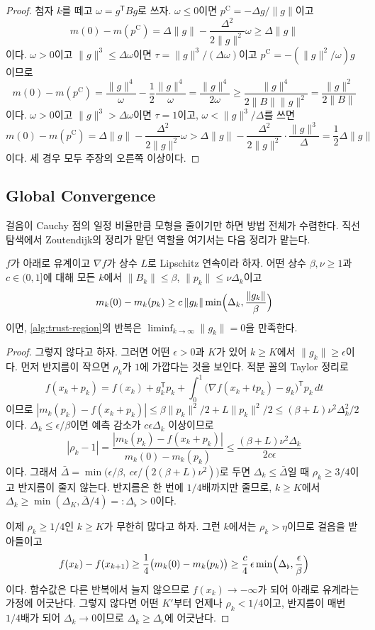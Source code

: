 \begin{proof}
첨자 $k$를 떼고 $\omega=g^{\mathsf T}Bg$로 쓰자. $\omega\le0$이면 $p^{\mathrm C}=-\Delta g/\|g\|$이고
\[
m(0)-m(p^{\mathrm C})=\Delta\|g\|-\frac{\Delta^2}{2\|g\|^2}\omega\ge\Delta\|g\|
\]
이다. $\omega>0$이고 $\|g\|^3\le\Delta\omega$이면 $\tau=\|g\|^3/(\Delta\omega)$이고 $p^{\mathrm C}=-(\|g\|^2/\omega)g$이므로
\[
m(0)-m(p^{\mathrm C})=\frac{\|g\|^4}{\omega}-\frac12\frac{\|g\|^4}{\omega}=\frac{\|g\|^4}{2\omega}\ge\frac{\|g\|^4}{2\|B\|\|g\|^2}=\frac{\|g\|^2}{2\|B\|}
\]
이다. $\omega>0$이고 $\|g\|^3>\Delta\omega$이면 $\tau=1$이고, $\omega<\|g\|^3/\Delta$를 쓰면
\[
m(0)-m(p^{\mathrm C})=\Delta\|g\|-\frac{\Delta^2}{2\|g\|^2}\omega>\Delta\|g\|-\frac{\Delta^2}{2\|g\|^2}\cdot\frac{\|g\|^3}\Delta=\frac12\Delta\|g\|
\]
이다. 세 경우 모두 주장의 오른쪽 이상이다.
\end{proof}

\subsection{Global Convergence}

걸음이 Cauchy 점의 일정 비율만큼 모형을 줄이기만 하면 방법 전체가 수렴한다. 직선 탐색에서 Zoutendijk의 정리가 맡던 역할을 여기서는 다음 정리가 맡는다.

\begin{theorem}
\label{thm:tr-convergence}
$f$가 아래로 유계이고 $\nabla f$가 상수 $L$로 Lipschitz 연속이라 하자. 어떤 상수 $\beta,\nu\ge1$과 $c\in(0,1]$에 대해 모든 $k$에서 $\|B_k\|\le\beta$, $\|p_k\|\le\nu\Delta_k$이고
\[
m_k(0)-m_k(p_k)\ge c\,\|g_k\|\min\Bigl(\Delta_k,\frac{\|g_k\|}{\beta}\Bigr)
\]
이면, \cref{alg:trust-region}의 반복은 $\liminf_{k\to\infty}\|g_k\|=0$을 만족한다.
\end{theorem}

\begin{proof}
그렇지 않다고 하자. 그러면 어떤 $\epsilon>0$과 $K$가 있어 $k\ge K$에서 $\|g_k\|\ge\epsilon$이다. 먼저 반지름이 작으면 $\rho_k$가 $1$에 가깝다는 것을 보인다. 적분 꼴의 Taylor 정리로
\[
f(x_k+p_k)=f(x_k)+g_k^{\mathsf T}p_k+\int_0^1\bigl(\nabla f(x_k+tp_k)-g_k\bigr)^{\mathsf T}p_k\,dt
\]
이므로 $|m_k(p_k)-f(x_k+p_k)|\le\beta\|p_k\|^2/2+L\|p_k\|^2/2\le(\beta+L)\nu^2\Delta_k^2/2$이다. $\Delta_k\le\epsilon/\beta$이면 예측 감소가 $c\epsilon\Delta_k$ 이상이므로
\[
|\rho_k-1|=\frac{|m_k(p_k)-f(x_k+p_k)|}{m_k(0)-m_k(p_k)}\le\frac{(\beta+L)\nu^2\Delta_k}{2c\epsilon}
\]
이다. 그래서 $\bar\Delta=\min\bigl(\epsilon/\beta,\ c\epsilon/(2(\beta+L)\nu^2)\bigr)$로 두면 $\Delta_k\le\bar\Delta$일 때 $\rho_k\ge3/4$이고 반지름이 줄지 않는다. 반지름은 한 번에 $1/4$배까지만 줄므로, $k\ge K$에서 $\Delta_k\ge\min(\Delta_K,\bar\Delta/4)=:\Delta_\flat>0$이다.

이제 $\rho_k\ge1/4$인 $k\ge K$가 무한히 많다고 하자. 그런 $k$에서는 $\rho_k>\eta$이므로 걸음을 받아들이고
\[
f(x_k)-f(x_{k+1})\ge\frac14\bigl(m_k(0)-m_k(p_k)\bigr)\ge\frac c4\,\epsilon\min\Bigl(\Delta_\flat,\frac\epsilon\beta\Bigr)
\]
이다. 함수값은 다른 반복에서 늘지 않으므로 $f(x_k)\to-\infty$가 되어 아래로 유계라는 가정에 어긋난다. 그렇지 않다면 어떤 $K'$부터 언제나 $\rho_k<1/4$이고, 반지름이 매번 $1/4$배가 되어 $\Delta_k\to0$이므로 $\Delta_k\ge\Delta_\flat$에 어긋난다.
\end{proof}

